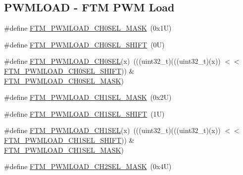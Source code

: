 \subsection*{P\+W\+M\+L\+O\+AD -\/ F\+TM P\+WM Load}
\begin{DoxyCompactItemize}
\item 
\#define \mbox{\hyperlink{group___f_t_m___register___masks_ga3aed163f12371474717169636b2d9620}{F\+T\+M\+\_\+\+P\+W\+M\+L\+O\+A\+D\+\_\+\+C\+H0\+S\+E\+L\+\_\+\+M\+A\+SK}}~(0x1\+U)
\item 
\#define \mbox{\hyperlink{group___f_t_m___register___masks_ga02d773d77ba9c505275e876cd180cd79}{F\+T\+M\+\_\+\+P\+W\+M\+L\+O\+A\+D\+\_\+\+C\+H0\+S\+E\+L\+\_\+\+S\+H\+I\+FT}}~(0\+U)
\item 
\#define \mbox{\hyperlink{group___f_t_m___register___masks_gaa6c36bb351452bfa99090e139d5d227e}{F\+T\+M\+\_\+\+P\+W\+M\+L\+O\+A\+D\+\_\+\+C\+H0\+S\+EL}}(x)~(((uint32\+\_\+t)(((uint32\+\_\+t)(x)) $<$$<$ \mbox{\hyperlink{group___f_t_m___register___masks_ga02d773d77ba9c505275e876cd180cd79}{F\+T\+M\+\_\+\+P\+W\+M\+L\+O\+A\+D\+\_\+\+C\+H0\+S\+E\+L\+\_\+\+S\+H\+I\+FT}})) \& \mbox{\hyperlink{group___f_t_m___register___masks_ga3aed163f12371474717169636b2d9620}{F\+T\+M\+\_\+\+P\+W\+M\+L\+O\+A\+D\+\_\+\+C\+H0\+S\+E\+L\+\_\+\+M\+A\+SK}})
\item 
\#define \mbox{\hyperlink{group___f_t_m___register___masks_ga01a9bbb1d2eca61c95255992a5a13e19}{F\+T\+M\+\_\+\+P\+W\+M\+L\+O\+A\+D\+\_\+\+C\+H1\+S\+E\+L\+\_\+\+M\+A\+SK}}~(0x2\+U)
\item 
\#define \mbox{\hyperlink{group___f_t_m___register___masks_gae4943b2c121fcb66763b08960f09bff4}{F\+T\+M\+\_\+\+P\+W\+M\+L\+O\+A\+D\+\_\+\+C\+H1\+S\+E\+L\+\_\+\+S\+H\+I\+FT}}~(1\+U)
\item 
\#define \mbox{\hyperlink{group___f_t_m___register___masks_ga62f50a5200044f5e158c8147df8d0284}{F\+T\+M\+\_\+\+P\+W\+M\+L\+O\+A\+D\+\_\+\+C\+H1\+S\+EL}}(x)~(((uint32\+\_\+t)(((uint32\+\_\+t)(x)) $<$$<$ \mbox{\hyperlink{group___f_t_m___register___masks_gae4943b2c121fcb66763b08960f09bff4}{F\+T\+M\+\_\+\+P\+W\+M\+L\+O\+A\+D\+\_\+\+C\+H1\+S\+E\+L\+\_\+\+S\+H\+I\+FT}})) \& \mbox{\hyperlink{group___f_t_m___register___masks_ga01a9bbb1d2eca61c95255992a5a13e19}{F\+T\+M\+\_\+\+P\+W\+M\+L\+O\+A\+D\+\_\+\+C\+H1\+S\+E\+L\+\_\+\+M\+A\+SK}})
\item 
\#define \mbox{\hyperlink{group___f_t_m___register___masks_gabd7f8ac1fa597d6b97b85926ae9e6fec}{F\+T\+M\+\_\+\+P\+W\+M\+L\+O\+A\+D\+\_\+\+C\+H2\+S\+E\+L\+\_\+\+M\+A\+SK}}~(0x4\+U)
\item 

\end{DoxyCompactItemize}
